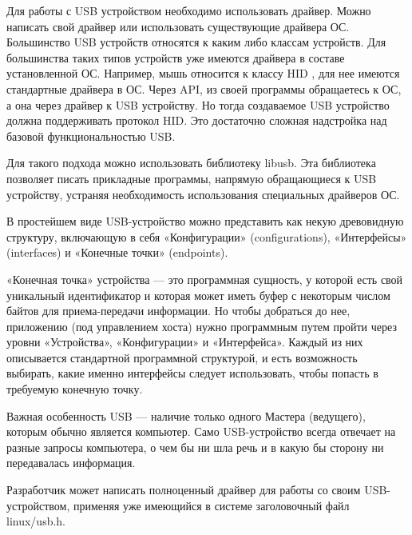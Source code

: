 \documentclass[14pt,a4paper]{article}
\begin{document}
\par Для работы с USB устройством необходимо использовать драйвер.  Можно написать свой драйвер или использовать существующие драйвера ОС. Большинство USB устройств относятся к каким либо классам устройств. Для большинства таких типов устройств уже имеются драйвера в составе установленной ОС. Например, мышь относится к классу HID , для нее имеются стандартные драйвера в ОС. Через API, из своей программы обращаетесь к ОС, а она через драйвер к USB устройству. Но тогда создаваемое USB устройство должна поддерживать протокол HID. Это достаточно сложная надстройка над базовой функциональностью USB.\\

\par Для такого подхода можно использовать библиотеку libusb. Эта библиотека позволяет писать прикладные программы, напрямую обращающиеся к USB устройству, устраняя необходимость использования специальных драйверов ОС.\\

\par  В простейшем виде USB-устройство можно представить как некую древовидную структуру, включающую в себя «Конфигурации» (configurations), «Интерфейсы» (interfaces) и «Конечные точки» (endpoints).

\par «Конечная точка» устройства — это программная сущность, у которой есть свой уникальный идентификатор и которая может иметь буфер с некоторым числом байтов для приема-передачи информации. Но чтобы добраться до нее, приложению (под управлением хоста) нужно программным путем пройти через уровни «Устройства», «Конфигурации» и «Интерфейса». Каждый из них описывается стандартной программной структурой, и есть возможность выбирать, какие именно интерфейсы следует использовать, чтобы попасть в требуемую конечную точку.\\

\par Важная особенность USB — наличие только одного Мастера (ведущего), которым обычно является компьютер. Само USB-устройство всегда отвечает на разные запросы компьютера, о чем бы ни шла речь и в какую бы сторону ни передавалась информация.\\

\par Разработчик может написать полноценный драйвер для работы со своим USB-устройством, применяя уже имеющийся в системе заголовочный файл linux/usb.h.\\
\end{document}
